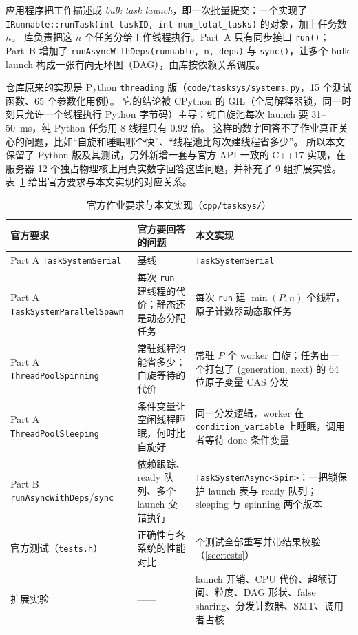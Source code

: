 \documentclass[11pt,a4paper]{ctexart}
\begin{document}
应用程序把工作描述成 \emph{bulk task launch}，即一次批量提交：一个实现了 \texttt{IRunnable::\allowbreak{}runTask(int taskID, int num\_\allowbreak{}total\_\allowbreak{}tasks)} 的对象，加上任务数 $n$。
库负责把这 $n$ 个任务分给工作线程执行。Part~A 只有同步接口 \texttt{run()}；Part~B 增加了
\texttt{runAsyncWithDeps(runnable, n, deps)} 与 \texttt{sync()}，让多个 bulk launch 构成一张有向无环图（DAG），由库按依赖关系调度。

仓库原来的实现是 Python \texttt{threading} 版（\texttt{code/tasksys/systems.py}，15 个测试函数、65 个参数化用例）。
它的结论被 CPython 的 GIL（全局解释器锁，同一时刻只允许一个线程执行 Python 字节码）主导：纯自旋池每次 launch 要 31--50~ms，纯 Python 任务用 8 线程只有 0.92 倍。
这样的数字回答不了作业真正关心的问题，比如``自旋和睡眠哪个快''、``线程池比每次建线程省多少''。
所以本文保留了 Python 版及其测试，另外新增一套与官方 API 一致的 C++17 实现，在服务器 12 个独占物理核上用真实数字回答这些问题，并补充了 9 组扩展实验。
表~\ref{tab:map} 给出官方要求与本文实现的对应关系。

\begin{table}[H]
\centering
\caption{官方作业要求与本文实现（\texttt{cpp/tasksys/}）}
\label{tab:map}
\small
\begin{tabularx}{\linewidth}{>{\raggedright}p{4.5cm}>{\raggedright}X>{\raggedright\arraybackslash}X}
\toprule
官方要求 & 官方要回答的问题 & 本文实现 \\
\midrule
Part A \texttt{TaskSystemSerial} & 基线 & \texttt{TaskSystemSerial} \\
Part A \texttt{TaskSystem\-ParallelSpawn} & 每次 \texttt{run} 建线程的代价；静态还是动态分配任务 & 每次 \texttt{run} 建 $\min(P,n)$ 个线程，原子计数器动态取任务 \\
Part A \texttt{ThreadPoolSpinning} & 常驻线程池能省多少；自旋等待的代价 & 常驻 $P$ 个 worker 自旋；任务由一个打包了 (generation, next) 的 64 位原子变量 CAS 分发 \\
Part A \texttt{ThreadPoolSleeping} & 条件变量让空闲线程睡眠，何时比自旋好 & 同一分发逻辑，worker 在 \texttt{condition\_\allowbreak{}variable} 上睡眠，调用者等待 done 条件变量 \\
Part B \texttt{runAsyncWithDeps}/\texttt{sync} & 依赖跟踪、ready 队列、多个 launch 交错执行 & \texttt{TaskSystemAsync<Spin>}：一把锁保护 launch 表与 ready 队列；sleeping 与 spinning 两个版本 \\
官方测试（\texttt{tests.h}） & 正确性与各系统的性能对比 & 20 个测试全部重写并带结果校验（\cref{sec:tests}） \\
扩展实验 & —— & launch 开销、CPU 代价、超额订阅、粒度、DAG 形状、false sharing、分发计数器、SMT、调用者占核 \\
\bottomrule
\end{tabularx}
\end{table}
\end{document}
